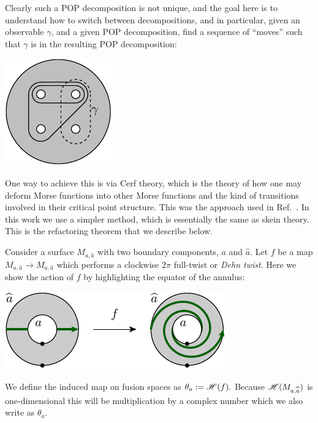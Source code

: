 \documentclass[aps, tightenlines, letterpaper, onecolumn, superscriptaddress, notitlepage, 11pt, groupedaddress]{revtex4-1}
\begin{document}
Clearly such a POP decomposition is not unique,
and the goal here is to understand how to switch between decompositions,
and in particular, given an observable $\gamma$,
and a given POP decomposition, find a sequence
of ``moves'' such that $\gamma$ is in the resulting POP
decomposition:
\begin{center}
\includegraphics[]{pic-refactor.pdf}
\end{center}

One way to achieve this is via Cerf theory, which is the theory
of how one may deform Morse functions into other Morse functions
and the kind of transitions involved in their critical point structure.
This was the approach used in Ref.~\cite{Freedman2002simulation}.
In this work we use a simpler method,
which is essentially the same as {skein theory.}
This is the {refactoring theorem} that we describe below.

Consider a surface $M_{a,\widehat{a}}$
with two boundary components, $a$ and $\widehat{a}.$
Let $f$ be a map $M_{a,\widehat{a}}\to M_{a,\widehat{a}}$
which performs a clockwise $2\pi$ full-twist or \emph{Dehn twist}.
Here we show the action of $f$ by highlighting the
equator of the annulus:
\begin{center}
\includegraphics[]{pic-dehn-twist.pdf}
\end{center}
We define the 
induced map on fusion spaces as $\theta_a := \mathscr{H}(f).$
Because $\mathscr{H}(M_{a,\widehat{a}})$ is one-dimensional
this will be multiplication by a complex number which we also
write as $\theta_a.$
\end{document}
